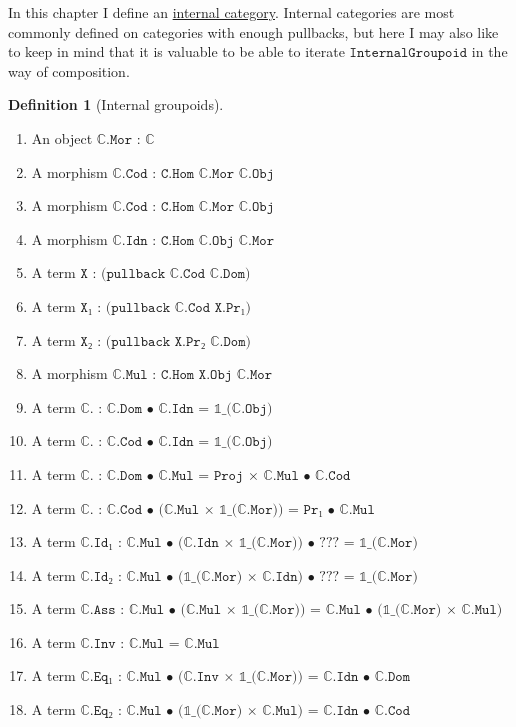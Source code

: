 \documentclass{book}
\theoremstyle{definition}
\newtheorem{definition}{Definition}
\begin{document}
In this chapter I define an \href{https://ncatlab.org/nlab/show/internal+category}{internal category}. Internal categories are most commonly defined on categories with enough pullbacks, but here I may also like to keep in mind that it is valuable to be able to iterate $\texttt{InternalGroupoid}$ in the way of composition.\\

\begin{definition}[Internal groupoids] 
\begin{enumerate}
\item An object $\texttt{ℂ.Mor : ℂ}$ 
\item A morphism $\texttt{ℂ.Cod : C.Hom ℂ.Mor ℂ.Obj}$
\item A morphism $\texttt{ℂ.Cod : C.Hom ℂ.Mor ℂ.Obj}$
\item A morphism $\texttt{ℂ.Idn : C.Hom ℂ.Obj ℂ.Mor}$
\item A term $\texttt{X : (pullback ℂ.Cod ℂ.Dom)}$
\item A term $\texttt{X₁ : (pullback ℂ.Cod X.Pr₁)}$
\item A term $\texttt{X₂ : (pullback X.Pr₂ ℂ.Dom)}$
\item A morphism $\texttt{ℂ.Mul : C.Hom X.Obj ℂ.Mor}$
\item A term $\texttt{ℂ. : ℂ.Dom • ℂ.Idn = 𝟙\_(ℂ.Obj)}$
\item A term $\texttt{ℂ. : ℂ.Cod • ℂ.Idn = 𝟙\_(ℂ.Obj)}$
\item A term $\texttt{ℂ. : ℂ.Dom • ℂ.Mul =  Proj × ℂ.Mul • ℂ.Cod}$
\item A term $\texttt{ℂ. : ℂ.Cod • (ℂ.Mul × 𝟙\_(ℂ.Mor)) = Pr₁ • ℂ.Mul}$
\item A term $\texttt{ℂ.Id₁ : ℂ.Mul • (ℂ.Idn × 𝟙\_(ℂ.Mor)) • ??? = 𝟙\_(ℂ.Mor)}$
\item A term $\texttt{ℂ.Id₂ : ℂ.Mul • (𝟙\_(ℂ.Mor) × ℂ.Idn) • ??? = 𝟙\_(ℂ.Mor)}$
\item A term $\texttt{ℂ.Ass : ℂ.Mul • (ℂ.Mul × 𝟙\_(ℂ.Mor)) = ℂ.Mul • (𝟙\_(ℂ.Mor) × ℂ.Mul)}$
\item A term $\texttt{ℂ.Inv : ℂ.Mul = ℂ.Mul}$
\item A term $\texttt{ℂ.Eq₁ : ℂ.Mul • (ℂ.Inv × 𝟙\_(ℂ.Mor)) = ℂ.Idn • ℂ.Dom}$
\item A term $\texttt{ℂ.Eq₂ : ℂ.Mul • (𝟙\_(ℂ.Mor) × ℂ.Mul) = ℂ.Idn • ℂ.Cod}$
\end{enumerate}
\end{definition}
\end{document}
